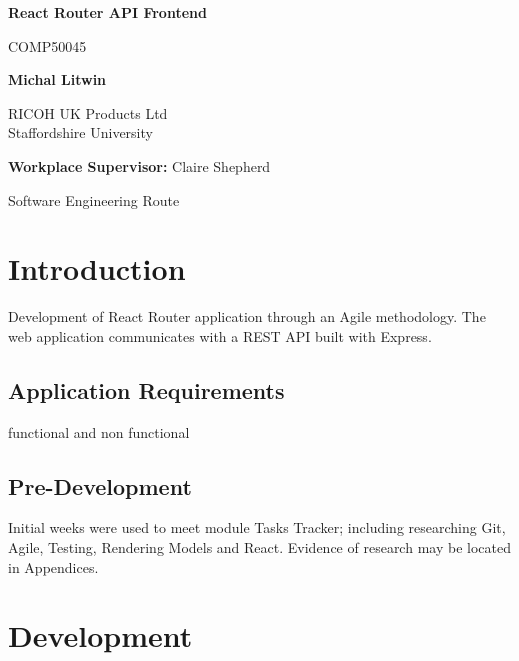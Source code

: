 \documentclass{article}
\begin{document}
\begin{titlepage}
    \begin{center}
        \vspace*{1cm}

        {\Huge\bfseries React Router API Frontend \par}
        \vspace{0.5cm}
        {\Large COMP50045\par}

        \vspace{1.5cm}
        {\large\bfseries Michal Litwin \par}
        \large
        RICOH UK Products Ltd\\
        Staffordshire University

        \vfill

        {\large \textbf{Workplace Supervisor:} Claire Shepherd \par}
        \vspace{0.8cm}

        \large Software Engineering Route\\

    \end{center}
\end{titlepage}



\section{Introduction}
Development of React Router application through an Agile methodology.
The web application communicates with a REST API built with Express.


\subsection{Application Requirements}
functional and non functional

\subsection{Pre-Development}
Initial weeks were used to meet module Tasks Tracker; including researching Git, Agile, Testing, Rendering Models and React.
Evidence of research may be located in {Appendices}.

\pagebreak{}

\section{Development}
\end{document}
